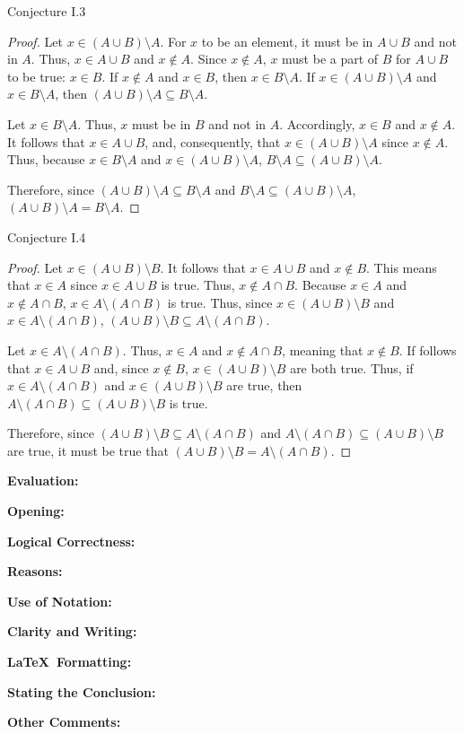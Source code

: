 \documentclass[11pt,titlepage]{article}		%
\def\rubric{\textbf{Evaluation:} \makebox[0.75in]{\hrulefill}

\vspace{.3in}

\textbf{Opening:} \makebox[0.75in]{\hrulefill}

\vspace{.3in}

\textbf{Logical Correctness:} \makebox[0.75in]{\hrulefill}

\vspace{.3in}

\textbf{Reasons:} \makebox[0.75in]{\hrulefill}

\vspace{.3in}

\textbf{Use of Notation:} \makebox[0.75in]{\hrulefill}

\vspace{.3in}

\textbf{Clarity and Writing:} \makebox[0.75in]{\hrulefill}

\vspace{.3in}

\textbf{\LaTeX\ Formatting:} \makebox[0.75in]{\hrulefill}

\vspace{.3in}

\textbf{Stating the Conclusion:} \makebox[0.75in]{\hrulefill}

\vspace{.3in}

\textbf{Other Comments:}

\vspace{1in}

}
\theoremstyle{theorem}
\begin{document}
Conjecture I.3
\begin{proof}
Let $x\in (A \cup B)\setminus A$. For $x$ to be an element, it must be in $A\cup B$ and not in $A$. Thus, $x\in A\cup B$ and $x\not\in A$. Since $x\not\in A$, $x$ must be a part of $B$ for $A\cup B$ to be true: $x\in B$. If $x\not\in A$ and $x\in B$, then $x\in B\setminus A$. If $x\in (A \cup B)\setminus A$ and $x\in B\setminus A$, then $(A \cup B)\setminus A \subseteq B \setminus A$.

Let $x\in B\setminus A$. Thus, $x$ must be in $B$ and not in $A$. Accordingly, $x\in B$ and $x\not\in A$. It follows that $x \in A\cup B$, and, consequently, that $x \in (A \cup B)\setminus A$ since $x \not \in A$. Thus, because $x\in B \setminus A$ and $x \in (A \cup B)\setminus A$, $B\setminus A \subseteq (A\cup B)\setminus A$.

Therefore, since $(A \cup B)\setminus A \subseteq B \setminus A$ and $B\setminus A \subseteq (A\cup B)\setminus A$, $(A \cup B)\setminus A = B \setminus A$.
\end{proof}

Conjecture I.4
\begin{proof}
Let $x \in (A \cup B) \setminus B$. It follows that $x \in A\cup B$ and $x\not\in B$. This means that $x\in A$ since $x\in A\cup B$ is true. Thus, $x\not\in A\cap B$. Because $x\in A$ and $x\not\in A \cap B$, $x\in A\setminus (A\cap B)$ is true. Thus, since $x\in (A \cup B) \setminus B$ and $x\in A\setminus (A\cap B)$, $ (A\cup B) \setminus B \subseteq A\setminus (A \cap B)$.

Let $x \in A\setminus(A\cap B)$. Thus, $x \in A$ and $x \not \in A \cap B$, meaning that $x \not\in B$. If follows that $x \in A \cup B$ and, since $x \not \in B$, $ x\in (A \cup B)\setminus B$ are both true. Thus, if $x \in A\setminus(A\cap B)$ and $ x\in (A \cup B)\setminus B$ are true, then $A\setminus(A\cap B) \subseteq (A \cup B)\setminus B$ is true.

Therefore, since $ (A\cup B) \setminus B \subseteq A\setminus (A \cap B)$ and $A\setminus(A\cap B) \subseteq (A \cup B)\setminus B$ are true, it must be true that $ (A\cup B) \setminus B = A\setminus (A \cap B)$.
\end{proof}


\rubric
\end{document}
